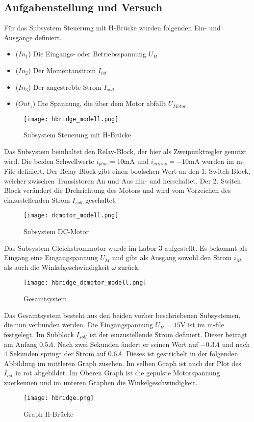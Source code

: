 \subsection{Aufgabenstellung und Versuch}

Für das Subsystem Steuerung mit H-Brücke wurden folgenden Ein- und Ausgänge
definiert.\\

\begin{itemize}
    \item ($In_1$) Die Eingangs- oder Betriebsspannung $U_H$
    \item ($In_2$) Der Momentanstrom $I_{ist}$
    \item ($In_3$) Der angestrebte Strom $I_{soll}$
    \item ($Out_1$) Die Spannung, die über dem Motor abfällt $U_{Motor}$
\end{itemize}


\begin{figure}[H]
    \centering
    \texttt{[image: hbridge\_modell.png]}
    \caption{Subsystem Steuerung mit H-Brücke}
    \label{fig:Subsystem H-Bridge}
\end{figure}

Das Subsystem beinhaltet den Relay-Block, der hier als Zweipunktregler genutzt
wird. Die beiden Schwellwerte $i_{plus}=10\mathrm{mA}$ und $i_{minus}=-10
\mathrm{mA}$ wurden im m-File definiert. Der Relay-Block gibt einen boolschen Wert
an den 1. Switch-Block, welcher zwischen Transistoren An und Aus hin- und
herschaltet. Der 2. Switch Block verändert die Drehrichtung des Motors und
wird vom Vorzeichen des einzustellenden Strom $I_{soll}$ geschaltet.

\begin{figure}[H]
    \centering
    \texttt{[image: dcmotor\_modell.png]}
    \caption{Subsystem DC-Motor}
    \label{fig:Subsystem DC-Motor}
\end{figure}

Das Subsystem Gleichstrommotor wurde im Labor 3 aufgestellt. Es bekommt
als Eingang eine Eingangspannung $U_M$ und gibt als Ausgang sowohl den
Strom $i_M$ als auch die Winkelgeschwindigkeit $\omega$ zurück.

\begin{figure}[H]
    \centering
    \texttt{[image: hbridge\_dcmotor\_modell.png]}
    \caption{Gesamtsystem}
    \label{fig:Gesamtsystem}
\end{figure}

Das Gesamtsystem besteht aus den beiden vorher beschriebenen Subsystemen, die nun
verbunden werden. Die Eingangspannung $U_H=15\mathrm{V}$ ist im m-file festgelegt.
Im Subblock $I_{soll}$ ist der einzustellende Strom definiert. Dieser beträgt
am Anfang $0.5A$. Nach zwei Sekunden ändert er seinen Wert auf $-0.3A$ und nach
4 Sekunden springt der Strom auf $0.6A$. Dieses ist gestrichelt in der folgenden Abbildung im mittleren Graph zusehen.
Im selben Graph ist auch der Plot des $I_{ist}$ in rot abgebildet. Im Oberen Graph
ist die gepulste Motorspannung zuerkennen und im unteren Graphen die Winkelgeschwindigkeit.

\begin{figure}[H]
    \centering
    \texttt{[image: hbridge.png]}
    \caption{Graph H-Brücke}
    \label{fig:Graph H-Bridge}
\end{figure}

